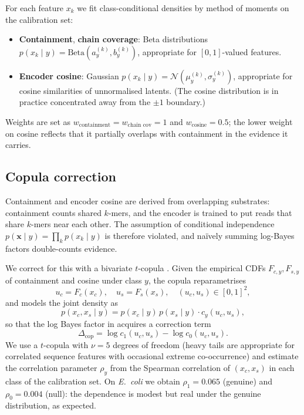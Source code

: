 \documentclass[11pt]{article}
\begin{document}
For each feature $x_k$ we fit class-conditional densities by method of
moments on the calibration set:
\begin{itemize}
    \item \textbf{Containment}, \textbf{chain coverage}: Beta distributions
    $p(x_k \mid y) = \mathrm{Beta}(a_y^{(k)}, b_y^{(k)})$, appropriate for
    $[0,1]$-valued features.
    \item \textbf{Encoder cosine}: Gaussian $p(x_k \mid y) =
    \mathcal{N}(\mu_y^{(k)}, \sigma_y^{(k)})$, appropriate for cosine
    similarities of unnormalised latents. (The cosine distribution is in
    practice concentrated away from the $\pm 1$ boundary.)
\end{itemize}

Weights are set as $w_{\text{containment}} = w_{\text{chain cov}} = 1$
and $w_{\text{cosine}} = 0.5$; the lower weight on cosine reflects that it
partially overlaps with containment in the evidence it carries.

\subsection{Copula correction}
\label{sec:copula}

Containment and encoder cosine are derived from overlapping substrates:
containment counts shared $k$-mers, and the encoder is trained to put reads
that share $k$-mers near each other. The assumption of conditional
independence $p(\mathbf{x} \mid y) = \prod_k p(x_k \mid y)$ is therefore
violated, and na\"ively summing log-Bayes factors double-counts evidence.

We correct for this with a bivariate $t$-copula \citep{nelsen2006copula}.
Given the empirical CDFs $F_{c,y}, F_{s,y}$ of containment and cosine under
class $y$, the copula reparametrises
\begin{equation}
    u_c = F_c(x_c), \quad u_s = F_s(x_s), \quad (u_c, u_s) \in [0,1]^2,
\end{equation}
and models the joint density as
\begin{equation}
    p(x_c, x_s \mid y) = p(x_c \mid y) \, p(x_s \mid y) \cdot c_y(u_c, u_s),
\end{equation}
so that the log Bayes factor in  acquires a correction term
\begin{equation}
    \Delta_{\text{cop}} = \log c_1(u_c, u_s) - \log c_0(u_c, u_s).
\end{equation}
We use a $t$-copula with $\nu = 5$ degrees of freedom (heavy tails are
appropriate for correlated sequence features with occasional extreme
co-occurrence) and estimate the correlation parameter $\rho_y$ from the
Spearman correlation of $(x_c, x_s)$ in each class of the calibration set.
On \textit{E.\ coli} we obtain $\rho_1 = 0.065$ (genuine) and $\rho_0 =
0.004$ (null): the dependence is modest but real under the genuine
distribution, as expected.
\end{document}
